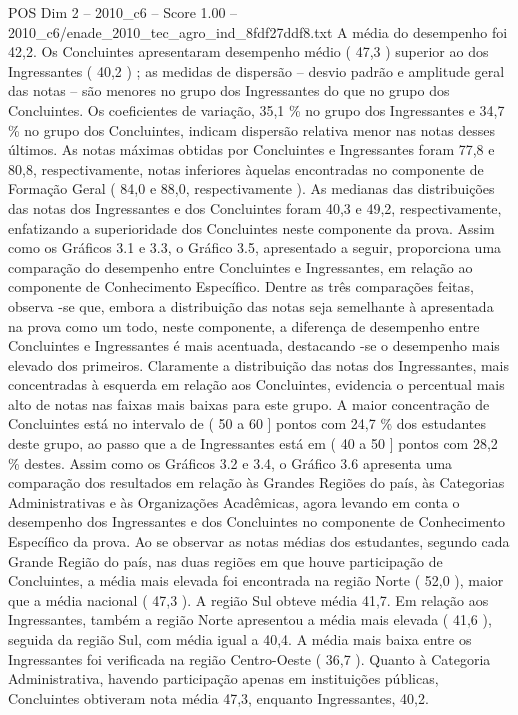 \begin{textsample}{POS Dim 2 – 2010\_c6 – Score 1.00 – 2010\_c6/enade\_2010\_tec\_agro\_ind\_8fdf27ddf8.txt}
A média do desempenho foi 42,2.
Os Concluintes apresentaram desempenho médio ( 47,3 ) superior ao dos Ingressantes ( 40,2 ) ; as medidas de dispersão – desvio padrão e amplitude geral das notas – são menores no grupo dos Ingressantes do que no grupo dos Concluintes.
Os coeficientes de variação, 35,1 \% no grupo dos Ingressantes e 34,7 \% no grupo dos Concluintes, indicam dispersão relativa menor nas notas desses últimos.
As notas máximas obtidas por Concluintes e Ingressantes foram 77,8 e 80,8, respectivamente, notas inferiores àquelas encontradas no componente de Formação Geral ( 84,0 e 88,0, respectivamente ).
As medianas das distribuições das notas dos Ingressantes e dos Concluintes foram 40,3 e 49,2, respectivamente, enfatizando a superioridade dos Concluintes neste componente da prova.
Assim como os Gráficos 3.1 e 3.3, o Gráfico 3.5, apresentado a seguir, proporciona uma comparação do desempenho entre Concluintes e Ingressantes, em relação ao componente de Conhecimento Específico.
Dentre as três comparações feitas, observa -se que, embora a distribuição das notas seja semelhante à apresentada na prova como um todo, neste componente, a diferença de desempenho entre Concluintes e Ingressantes é mais acentuada, destacando -se o desempenho mais elevado dos primeiros.
Claramente a distribuição das notas dos Ingressantes, mais concentradas à esquerda em relação aos Concluintes, evidencia o percentual mais alto de notas nas faixas mais baixas para este grupo.
A maior concentração de Concluintes está no intervalo de ( 50 a 60 ] pontos com 24,7 \% dos estudantes deste grupo, ao passo que a de Ingressantes está em ( 40 a 50 ] pontos com 28,2 \% destes.
Assim como os Gráficos 3.2 e 3.4, o Gráfico 3.6 apresenta uma comparação dos resultados em relação às Grandes Regiões do país, às Categorias Administrativas e às Organizações Acadêmicas, agora levando em conta o desempenho dos Ingressantes e dos Concluintes no componente de Conhecimento Específico da prova.
Ao se observar as notas médias dos estudantes, segundo cada Grande Região do país, nas duas regiões em que houve participação de Concluintes, a média mais elevada foi encontrada na região Norte ( 52,0 ), maior que a média nacional ( 47,3 ).
A região Sul obteve média 41,7.
Em relação aos Ingressantes, também a região Norte apresentou a média mais elevada ( 41,6 ), seguida da região Sul, com média igual a 40,4.
A média mais baixa entre os Ingressantes foi verificada na região Centro-Oeste ( 36,7 ).
Quanto à Categoria Administrativa, havendo participação apenas em instituições públicas, Concluintes obtiveram nota média 47,3, enquanto Ingressantes, 40,2.

\end{textsample}
